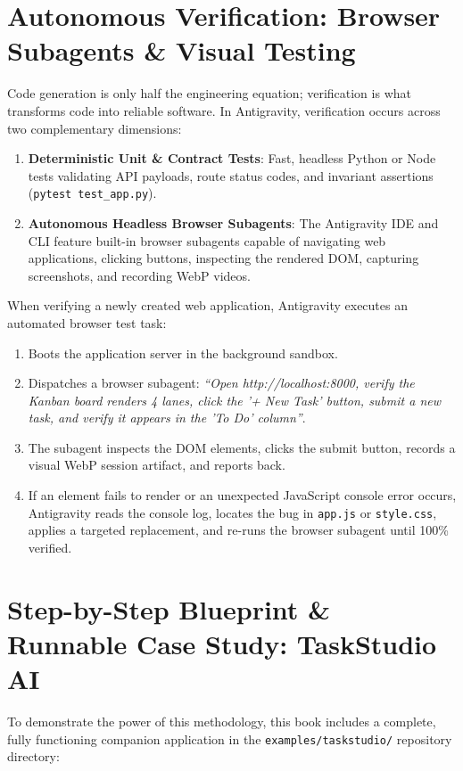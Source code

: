 \documentclass[11pt,a4paper,oneside]{book}
\begin{document}
\section{Autonomous Verification: Browser Subagents \& Visual Testing}
Code generation is only half the engineering equation; verification is what transforms code into reliable software. In Antigravity, verification occurs across two complementary dimensions:
\begin{enumerate}
    \item \textbf{Deterministic Unit \& Contract Tests}: Fast, headless Python or Node tests validating API payloads, route status codes, and invariant assertions (\texttt{pytest test\_app.py}).
    \item \textbf{Autonomous Headless Browser Subagents}: The Antigravity IDE and CLI feature built-in browser subagents capable of navigating web applications, clicking buttons, inspecting the rendered DOM, capturing screenshots, and recording WebP videos.
\end{enumerate}

\begin{cautionbox}
When verifying a newly created web application, Antigravity executes an automated browser test task:
\begin{enumerate}
    \item Boots the application server in the background sandbox.
    \item Dispatches a browser subagent: \textit{``Open http://localhost:8000, verify the Kanban board renders 4 lanes, click the '+ New Task' button, submit a new task, and verify it appears in the 'To Do' column''}.
    \item The subagent inspects the DOM elements, clicks the submit button, records a visual WebP session artifact, and reports back.
    \item If an element fails to render or an unexpected JavaScript console error occurs, Antigravity reads the console log, locates the bug in \texttt{app.js} or \texttt{style.css}, applies a targeted replacement, and re-runs the browser subagent until 100\% verified.
\end{enumerate}
\end{cautionbox}

\section{Step-by-Step Blueprint \& Runnable Case Study: TaskStudio AI}
To demonstrate the power of this methodology, this book includes a complete, fully functioning companion application in the \texttt{examples/taskstudio/} repository directory:
\end{document}
